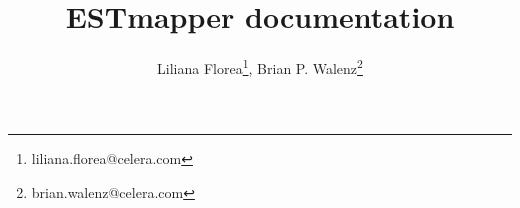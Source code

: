 \documentclass[twoside, twocolumn, 10pt]{article}
\begin{document}
%
%
\newcommand{\entrylabel}[1]{\mbox{\texttt{#1:}}\hfil}
\newenvironment{entry}
  {\begin{list}{}%
   {\renewcommand{\makelabel}{\entrylabel}%
   }}
{\end{list}}

\newcommand{\Lentrylabel}[1]{%
  {\parbox[b]{0pt}{\makebox[0pt][l]{\texttt{#1:}}\\}}\hfil\relax}
\newenvironment{Lentry}
  {\renewcommand{\entrylabel}{\Lentrylabel}\begin{entry}}
  {\end{entry}}

\title{ESTmapper documentation}
\author{
Liliana Florea\thanks{liliana.florea@celera.com},
Brian P. Walenz\thanks{brian.walenz@celera.com}}

\maketitle

\pagestyle{fancy}

\rhead[]{}
\lhead[\today]{\today}

\normalem

\newcommand{\ESTmapper}{{\sc ESTmapper\ }}
\end{document}
